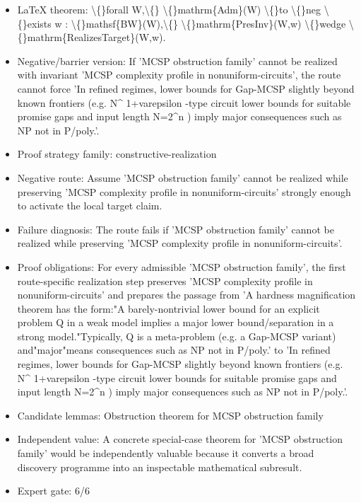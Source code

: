 \documentclass[11pt]{article}
\begin{document}
\begin{itemize}
\item LaTeX theorem: \textbackslash\{\}forall W,\textbackslash\{\} \textbackslash\{\}mathrm\{Adm\}(W) \textbackslash\{\}to \textbackslash\{\}neg \textbackslash\{\}exists w : \textbackslash\{\}mathsf\{BW\}(W),\textbackslash\{\} \textbackslash\{\}mathrm\{PresInv\}(W,w) \textbackslash\{\}wedge \textbackslash\{\}mathrm\{RealizesTarget\}(W,w).
\item Negative/barrier version: If 'MCSP obstruction family' cannot be realized with invariant 'MCSP complexity profile in nonuniform-circuits', the route cannot force 'In refined regimes, lower bounds for Gap-MCSP slightly beyond known frontiers (e.g. N\textasciicircum{} 1+varepsilon -type circuit lower bounds for suitable promise gaps and input length N=2\textasciicircum{}n ) imply major consequences such as NP not in P/poly.'.
\item Proof strategy family: constructive-realization
\item Negative route: Assume 'MCSP obstruction family' cannot be realized while preserving 'MCSP complexity profile in nonuniform-circuits' strongly enough to activate the local target claim.
\item Failure diagnosis: The route fails if 'MCSP obstruction family' cannot be realized while preserving 'MCSP complexity profile in nonuniform-circuits'.
\item Proof obligations: For every admissible 'MCSP obstruction family', the first route-specific realization step preserves 'MCSP complexity profile in nonuniform-circuits' and prepares the passage from 'A hardness magnification theorem has the form:"A barely-nontrivial lower bound for an explicit problem Q in a weak model implies a major lower bound/separation in a strong model."Typically, Q is a meta-problem (e.g. a Gap-MCSP variant) and"major"means consequences such as NP not in P/poly.' to 'In refined regimes, lower bounds for Gap-MCSP slightly beyond known frontiers (e.g. N\textasciicircum{} 1+varepsilon -type circuit lower bounds for suitable promise gaps and input length N=2\textasciicircum{}n ) imply major consequences such as NP not in P/poly.'.
\item Candidate lemmas: Obstruction theorem for MCSP obstruction family
\item Independent value: A concrete special-case theorem for 'MCSP obstruction family' would be independently valuable because it converts a broad discovery programme into an inspectable mathematical subresult.
\item Expert gate: 6/6
\end{itemize}
\end{document}
